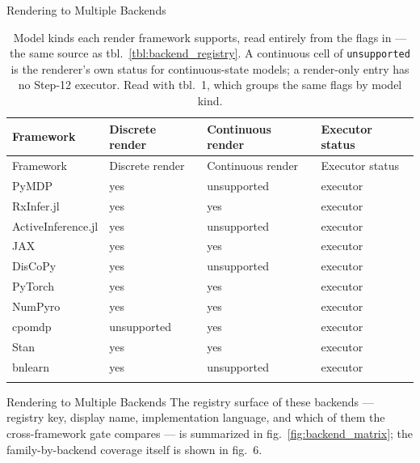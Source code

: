 \documentclass[
  ignorenonframetext,
]{beamer}
\begin{document}
\begin{frame}{Rendering to Multiple Backends}
\begin{longtable}[]{@{}llll@{}}
\caption{Model kinds each render framework supports, read entirely from
the flags in \protect{} ---
the same source as tbl.~\ref{tbl:backend_registry}. A continuous cell of
\protect\texttt{unsupported} is the renderer's own status for
continuous-state models; a render-only entry has no Step-12 executor.
Read with tbl.~1, which groups the same flags by
model kind.}\label{tbl:framework_capability}\tabularnewline
\toprule\noalign{}
Framework & Discrete render & Continuous render & Executor status \\
\midrule\noalign{}
\endfirsthead
\toprule\noalign{}
Framework & Discrete render & Continuous render & Executor status \\
\midrule\noalign{}
\endhead
PyMDP & yes & unsupported & executor \\
RxInfer.jl & yes & yes & executor \\
ActiveInference.jl & yes & unsupported & executor \\
JAX & yes & yes & executor \\
DisCoPy & yes & unsupported & executor \\
PyTorch & yes & yes & executor \\
NumPyro & yes & yes & executor \\
cpomdp & unsupported & yes & executor \\
Stan & yes & yes & executor \\
bnlearn & yes & unsupported & executor \\
\bottomrule\noalign{}
\end{longtable}

\end{frame}

\begin{frame}{Rendering to Multiple Backends}
The registry surface of these backends --- registry key, display name,
implementation language, and which of them the cross-framework gate
compares --- is summarized in fig.~\ref{fig:backend_matrix}; the
family-by-backend coverage itself is shown in
fig.~6.

\end{frame}
\end{document}
